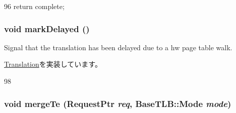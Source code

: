 \begin{DoxyCode}
96 { return complete; }
\end{DoxyCode}
\hypertarget{classArmISA_1_1Stage2LookUp_ad1fd11d1e352cfc4b329d29b46a19fc4}{
\subsubsection[{markDelayed}]{\setlength{\rightskip}{0pt plus 5cm}void markDelayed ()}}
\label{classArmISA_1_1Stage2LookUp_ad1fd11d1e352cfc4b329d29b46a19fc4}
Signal that the translation has been delayed due to a hw page table walk. 

\hyperlink{classBaseTLB_1_1Translation_ab88d5e1938190b55d7859d5cc4d10446}{Translation}を実装しています。


\begin{DoxyCode}
98 {}
\end{DoxyCode}
\hypertarget{classArmISA_1_1Stage2LookUp_a4cf48b3e3f9013b0ede4079a49d7591c}{
\subsubsection[{mergeTe}]{\setlength{\rightskip}{0pt plus 5cm}void mergeTe ({\bf RequestPtr} {\em req}, \/  {\bf BaseTLB::Mode} {\em mode})}}
\label{classArmISA_1_1Stage2LookUp_a4cf48b3e3f9013b0ede4079a49d7591c}



